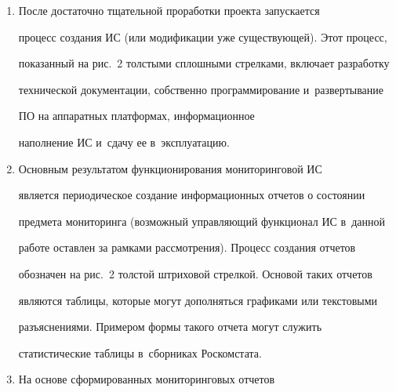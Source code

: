 \begin{enumerate}[1.]
\begin{itemize}
основе которого уточняются цели и~задачи ИС (т.\,е.\ осуществляется 


переход вновь к~пункту~(а) и,~при необходимости дальнейшего уточнения, 


к~следующей итерации~--- пунктам~(б) и~(в)).


     \end{itemize}


     Аналогичный процесс выполняется и~для подбора алгоритмов работы 


ИС, однако алгоритмы обычно носят более абстрактный характер, их 


методология достаточно хорошо проработана, поэтому фаза обращения к~


соответствующей предметной области в~общем случае не нужна 


(поэтому~этот цикл показан на рис.~2 одной двусторонней стрелкой).


     \item После достаточно тщательной проработки проекта запускается 


процесс создания ИС (или модификации уже существующей). Этот процесс, 


показанный на рис.~2 толстыми сплошными стрелками, включает разработку 


технической документации, собственно программирование и~развертывание 


ПО на аппаратных платформах, информационное 


наполнение ИС и~сдачу ее в~эксплуатацию.


     \item Основным результатом функционирования мониторинговой ИС 


является периодическое создание информационных отчетов о состоянии 


предмета мониторинга (возможный управляющий функционал ИС в~данной 


работе оставлен за рамками рассмотрения). Процесс создания отчетов 


обозначен на рис.~2 толстой штриховой стрелкой. Основой таких отчетов 


являются таблицы, которые могут дополняться графиками или текстовыми 


разъяснениями. Примером формы такого отчета могут служить 


статистические таблицы в~сборниках Роскомстата.


     \item На основе сформированных мониторинговых отчетов 



\end{enumerate}
